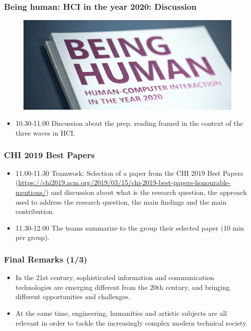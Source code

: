\documentclass[screen, aspectratio=169]{beamer}
\begin{document}
%
\begin{frame}
\frametitle{Being human: HCI in the year 2020: Discussion}
 \begin{figure}
	\includegraphics[scale=0.12]{img/being-human.jpg}
    \end{figure}	
\begin{itemize}
\item 10.30-11.00 Discussion about the prep. reading framed in the context of the three waves in HCI.
\end{itemize}
\end{frame}
%
\begin{frame}
\frametitle{CHI 2019 Best Papers}
\begin{itemize}
\item 11.00-11.30 Teamwork: Selection of a paper from the CHI 2019 Best Papers (\url{https://chi2019.acm.org/2019/03/15/chi-2019-best-papers-honourable-mentions/}) and discussion about what is the research question, the approach used to address the research question, the main findings and the main contribution.
\item 11.30-12.00 The teams summarize to the group their selected paper (10 min per group).
\end{itemize}
\end{frame}
%
\begin{frame}
\frametitle{Final Remarks (1/3)}
\begin{itemize}
\item In the 21st century, sophisticated information and communication technologies are emerging different from the 20th century, and bringing different opportunities and challenges.
\item At the same time, engineering, humanities and artistic subjects are all relevant in order to tackle the increasingly complex modern technical society. 
\end{itemize}
\end{frame}
%
\end{document}
